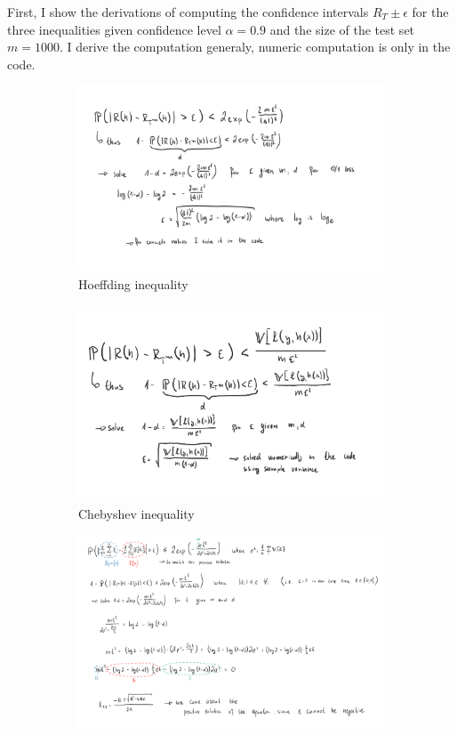 \documentclass[a4paper,11pt]{article}
\begin{document}
First, I show the derivations of computing the confidence intervals $R_T \pm \epsilon$ for the three inequalities given confidence level $\alpha = 0.9$ and the size of the test set $m = 1000$.
I derive the computation generaly, numeric computation is only in the code.
\begin{figure}[ht]
    \centering
    \begin{subfigure}[b]{0.45\textwidth}
        \includegraphics[width=\textwidth]{./hoeffding.png}
        \caption*{Hoeffding inequality}
    \end{subfigure}
    \hfill
    \begin{subfigure}[b]{0.45\textwidth}
        \includegraphics[width=\textwidth]{./chebyshev.png}
        \caption*{Chebyshev inequality}
    \end{subfigure}
    \begin{subfigure}[b]{0.9\textwidth}
        \includegraphics[width=\textwidth]{./bernstein.png}

\end{subfigure}
\end{figure}
\end{document}
